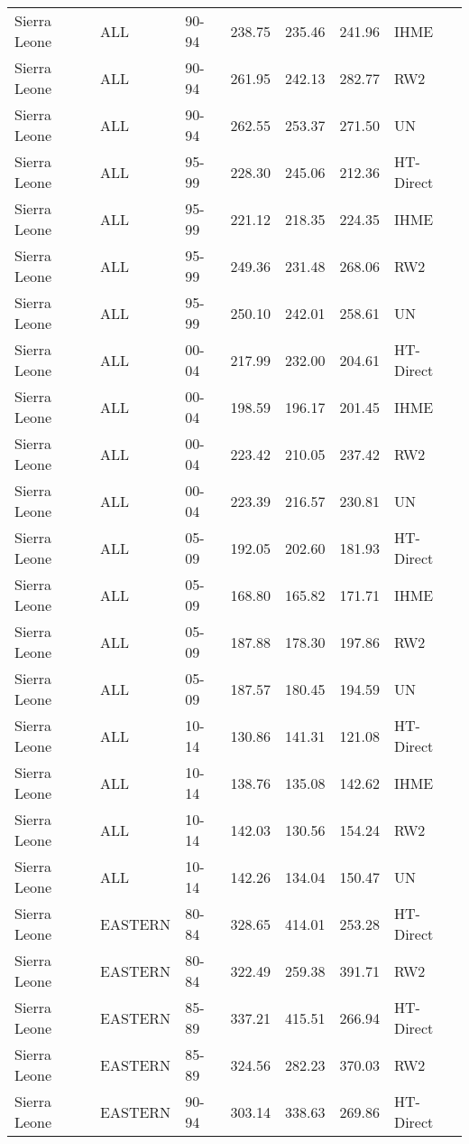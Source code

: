 \begin{longtable}{lllrrrl}
  Sierra Leone & ALL & 90-94 & 238.75 & 235.46 & 241.96 & IHME \\ 
  Sierra Leone & ALL & 90-94 & 261.95 & 242.13 & 282.77 & RW2 \\ 
  Sierra Leone & ALL & 90-94 & 262.55 & 253.37 & 271.50 & UN \\ 
  Sierra Leone & ALL & 95-99 & 228.30 & 245.06 & 212.36 & HT-Direct \\ 
  Sierra Leone & ALL & 95-99 & 221.12 & 218.35 & 224.35 & IHME \\ 
  Sierra Leone & ALL & 95-99 & 249.36 & 231.48 & 268.06 & RW2 \\ 
  Sierra Leone & ALL & 95-99 & 250.10 & 242.01 & 258.61 & UN \\ 
  Sierra Leone & ALL & 00-04 & 217.99 & 232.00 & 204.61 & HT-Direct \\ 
  Sierra Leone & ALL & 00-04 & 198.59 & 196.17 & 201.45 & IHME \\ 
  Sierra Leone & ALL & 00-04 & 223.42 & 210.05 & 237.42 & RW2 \\ 
  Sierra Leone & ALL & 00-04 & 223.39 & 216.57 & 230.81 & UN \\ 
  Sierra Leone & ALL & 05-09 & 192.05 & 202.60 & 181.93 & HT-Direct \\ 
  Sierra Leone & ALL & 05-09 & 168.80 & 165.82 & 171.71 & IHME \\ 
  Sierra Leone & ALL & 05-09 & 187.88 & 178.30 & 197.86 & RW2 \\ 
  Sierra Leone & ALL & 05-09 & 187.57 & 180.45 & 194.59 & UN \\ 
  Sierra Leone & ALL & 10-14 & 130.86 & 141.31 & 121.08 & HT-Direct \\ 
  Sierra Leone & ALL & 10-14 & 138.76 & 135.08 & 142.62 & IHME \\ 
  Sierra Leone & ALL & 10-14 & 142.03 & 130.56 & 154.24 & RW2 \\ 
  Sierra Leone & ALL & 10-14 & 142.26 & 134.04 & 150.47 & UN \\ 
  Sierra Leone & EASTERN & 80-84 & 328.65 & 414.01 & 253.28 & HT-Direct \\ 
  Sierra Leone & EASTERN & 80-84 & 322.49 & 259.38 & 391.71 & RW2 \\ 
  Sierra Leone & EASTERN & 85-89 & 337.21 & 415.51 & 266.94 & HT-Direct \\ 
  Sierra Leone & EASTERN & 85-89 & 324.56 & 282.23 & 370.03 & RW2 \\ 
  Sierra Leone & EASTERN & 90-94 & 303.14 & 338.63 & 269.86 & HT-Direct \\ 

\end{longtable}
